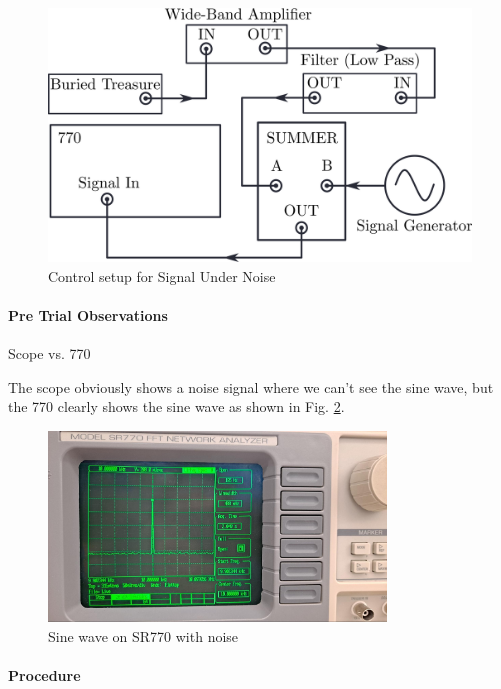 \documentclass[../main.tex]{subfiles}
\begin{document}
\begin{figure}[ht]
    \includegraphics[width=\textwidth]{exp1_1.png}
    \caption{Control setup for Signal Under Noise}
    \label{fig:exp1}
\end{figure}

\paragraph*{Pre Trial Observations} Scope vs. 770

The scope obviously shows a noise signal where we can't see the sine wave, but the 770 clearly shows the sine wave as shown in Fig. \ref{fig:1.8}.

\begin{figure}[ht]
    \centering
    \includegraphics[width=0.8\textwidth]{fig1_8.jpg}
    \caption{Sine wave on SR770 with noise}
    \label{fig:1.8}
\end{figure}

\newpage
\paragraph*{Procedure}
\end{document}

